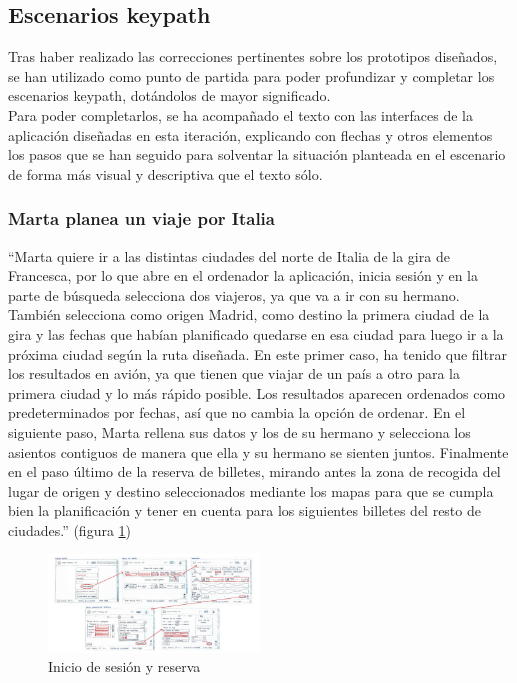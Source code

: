 \subsection{Escenarios keypath}
Tras haber realizado las correcciones pertinentes sobre los prototipos diseñados, se han utilizado como punto de partida para poder profundizar y completar los
escenarios keypath, dotándolos de mayor significado. \\

Para poder completarlos, se ha acompañado el texto con las interfaces de la aplicación diseñadas en esta iteración, explicando con flechas y otros elementos los pasos
que se han seguido para solventar la situación planteada en el escenario de forma más visual y descriptiva que el texto sólo.

\subsubsection{Marta planea un viaje por Italia}
“Marta quiere ir a las distintas ciudades del norte de Italia de la gira de Francesca, por lo que abre en el ordenador la aplicación, inicia sesión y en la parte de búsqueda selecciona dos viajeros, ya que va a ir con su hermano. También selecciona como origen Madrid, como destino la primera ciudad de la gira y las fechas que habían planificado quedarse en esa ciudad para luego ir a la próxima ciudad según la ruta diseñada. 
En este primer caso, ha tenido que filtrar los resultados en avión, ya que tienen que viajar de un país a otro para la primera ciudad y lo más rápido posible. Los resultados aparecen ordenados como predeterminados por fechas, así que no cambia la opción de ordenar. 
En el siguiente paso, Marta rellena sus datos y los de su hermano y selecciona los asientos contiguos de manera que ella y su hermano se sienten juntos.
Finalmente en el paso último de la reserva de billetes, mirando antes la zona de recogida del lugar de origen y destino seleccionados mediante los mapas para que se cumpla bien la planificación y tener en cuenta para los siguientes billetes del resto de ciudades.” (figura \ref{fig:Marta1})
\begin{figure}[h]
    \centering
    \includegraphics[width=0.5\textwidth]{Imagenes/Keypath/Marta1.png}
    \caption{Inicio de sesión y reserva}
    \label{fig:Marta1}
\end{figure}

